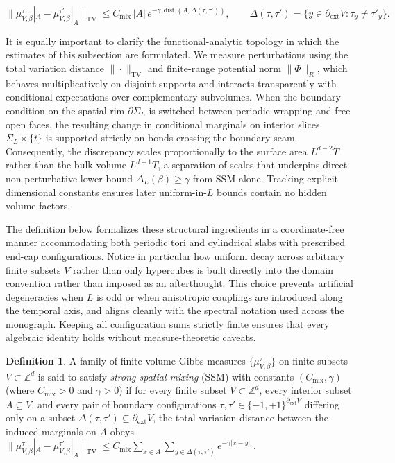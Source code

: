 \documentclass[11pt]{article}
\theoremstyle{definition}
\newtheorem{definition}[theorem]{Definition}
\begin{document}
\[
  \bigl\|\mu_{V,\beta}^{\tau}|_A - \mu_{V,\beta}^{\tau'}|_A\bigr\|_{\mathrm{TV}} \le C_{\mathrm{mix}} \, |A| \, e^{-\gamma \, \operatorname{dist}(A, \Delta(\tau, \tau'))}, \qquad \Delta(\tau, \tau') = \{y \in \partial_{\mathrm{ext}} V : \tau_y \neq \tau'_y\}.
\]

It is equally important to clarify the functional-analytic topology in which the
estimates of this subsection are formulated. We measure perturbations using the
total variation distance $\|\cdot\|_{\mathrm{TV}}$ and finite-range potential norm
$\|\Phi\|_R$, which behaves multiplicatively on disjoint supports and interacts
transparently with conditional expectations over complementary subvolumes. When the
boundary condition on the spatial rim $\partial \Sigma_L$ is switched between
periodic wrapping and free open faces, the resulting change in conditional marginals
on interior slices $\Sigma_L \times \{t\}$ is supported strictly on bonds crossing
the boundary seam. Consequently, the discrepancy scales proportionally to the
surface area $L^{d-2} T$ rather than the bulk volume $L^{d-1} T$, a separation of
scales that underpins direct non-perturbative lower bound $\Delta_L(\beta) \ge
\gamma$ from SSM alone. Tracking explicit dimensional constants ensures later
uniform-in-$L$ bounds contain no hidden volume factors.

The definition below formalizes these structural ingredients in a coordinate-free
manner accommodating both periodic tori and cylindrical slabs with prescribed
end-cap configurations. Notice in particular how uniform decay across arbitrary
finite subsets $V$ rather than only hypercubes is built directly into the domain
convention rather than imposed as an afterthought. This choice prevents artificial
degeneracies when $L$ is odd or when anisotropic couplings are introduced along the
temporal axis, and aligns cleanly with the spectral notation used across the
monograph. Keeping all configuration sums strictly finite ensures that every
algebraic identity holds without measure-theoretic caveats.

\begin{definition}
\label{def:s10-mixing}
A family of finite-volume Gibbs measures $\{\mu_{V,\beta}^\tau\}$ on finite subsets
$V \subset \mathbb{Z}^d$ is said to satisfy \emph{strong spatial mixing} (SSM) with
constants $(C_{\mathrm{mix}}, \gamma)$ (where $C_{\mathrm{mix}} > 0$ and $\gamma >
0$) if for every finite subset $V \subset \mathbb{Z}^d$, every interior subset $A
\subseteq V$, and every pair of boundary configurations $\tau, \tau' \in \{-1,
+1\}^{\partial_{\mathrm{ext}} V}$ differing only on a subset $\Delta(\tau, \tau')
\subseteq \partial_{\mathrm{ext}} V$, the total variation distance between the
induced marginals on $A$ obeys $\|\mu_{V,\beta}^\tau|_A -
\mu_{V,\beta}^{\tau'}|_A\|_{\mathrm{TV}} \le C_{\mathrm{mix}} \sum_{x \in A} \sum_{y
\in \Delta(\tau, \tau')} e^{-\gamma |x - y|_1}$.
\end{definition}
\end{document}
